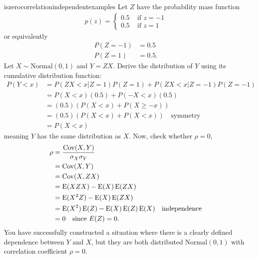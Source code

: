 \begin{subanswer}{iszerocorrelationindependentexamples}
Let $Z$ have the probability mass function
\begin{align*}
p(z) =
\begin{cases}
  0.5 & \text{ if } z = -1 \\
  0.5 & \text{ if } z = 1
\end{cases}
\end{align*}
or equivalently
\begin{align*}
P(Z = -1) &= 0.5  \\
P(Z =  1) &= 0.5
\text{.}
\end{align*}
Let $X \sim \text{Normal}(0,1)$
and
$Y = ZX$.
Derive the distribution of $Y$ using its cumulative distribution function:
\begin{align*}
P(Y<x) &=
P( ZX<x| Z = 1)P(Z=1) +
P( ZX<x| Z = -1)P(Z=-1) \\
&=
P( X<x)(0.5) + P(-X<x)(0.5) \\
&=  (0.5)( P( X<x) + P(X \geq -x)) \\
&=  (0.5)( P( X<x) + P(X < x)) \quad \text{symmetry} \\
&=   P(X < x)
\end{align*}
meaning $Y$ has the same distribution as $X$.
Now, check whether $\rho=0$,
\begin{align*}
\rho
&= \frac{\operatorname{\mathrm{Cov}}(X,Y)}{\sigma_X \sigma_Y}  \\
&= \operatorname{\mathrm{Cov}}(X,Y) \\
&= \operatorname{\mathrm{Cov}}(X, ZX) \\
&= \operatorname{\mathrm{E}}(XZX) - \operatorname{\mathrm{E}}(X) \operatorname{\mathrm{E}}(ZX)  \\
&= \operatorname{\mathrm{E}}(X^2 Z) - \operatorname{\mathrm{E}}(X) \operatorname{\mathrm{E}}(ZX)  \\
&= \operatorname{\mathrm{E}}(X^2) \operatorname{\mathrm{E}}(Z) - \operatorname{\mathrm{E}}(X)\operatorname{\mathrm{E}}(Z)\operatorname{\mathrm{E}}(X)   \quad \text{independence} \\
&=  0                                \quad \text{since } E(Z)=0
\text{.}
\end{align*}
You have successfully constructed a situation where
there is a clearly defined dependence between $Y$ and $X$, but
they are both distributed $\text{Normal}(0,1)$ with correlation coefficient
$\rho = 0$.
\end{subanswer}
